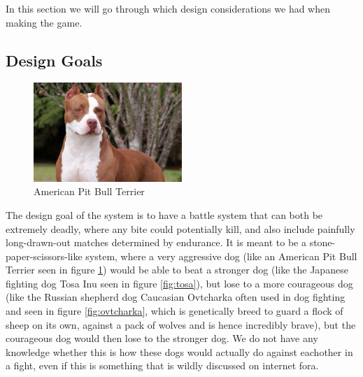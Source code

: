 In this section we will go through which design considerations we had when making the game.\

\subsection{Design Goals}
\begin{figure} 
	\centering
    \includegraphics[width=0.5\textwidth]{pitbull.jpg}
    \caption{American Pit Bull Terrier}
    \label{fig:pitbull}
\end{figure}

The design goal of the system is to have a battle system that can both be extremely deadly, where any bite could potentially kill, and also include painfully long-drawn-out matches determined by endurance. It is meant to be a stone-paper-scissors-like system, where a very aggressive dog (like an American Pit Bull Terrier seen in figure \ref{fig:pitbull}) would be able to beat a stronger dog (like the Japanese fighting dog Tosa Inu seen in figure \ref{fig:tosa}), but lose to a more courageous dog (like the Russian shepherd dog Caucasian Ovtcharka often used in dog fighting and seen in figure \ref{fig:ovtcharka}, which is genetically breed to guard a flock of sheep on its own, against a pack of wolves and is hence incredibly brave), but the courageous dog would then lose to the stronger dog. We do not have any knowledge whether this is how these dogs would actually do against eachother in a fight, even if this is something that is wildly discussed on internet fora.\

